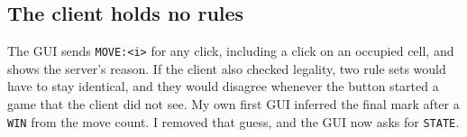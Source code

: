 \subsection{The client holds no rules}
The GUI sends \texttt{MOVE:<i>} for any click, including a click on an occupied
cell, and shows the server's reason. If the client also checked legality, two
rule sets would have to stay identical, and they would disagree whenever the
button started a game that the client did not see. My own first GUI inferred
the final mark after a \texttt{WIN} from the move count. I removed that guess,
and the GUI now asks for \texttt{STATE}.
